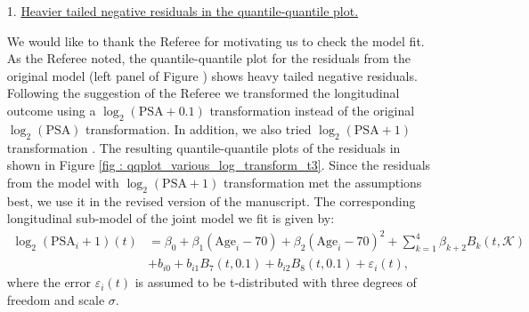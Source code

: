    \begin{enumerate}
        \item [1.] \underline{Heavier tailed negative residuals in the quantile-quantile plot.}

        We would like to thank the Referee for motivating us to check the model fit. As the Referee noted, the quantile-quantile plot for the residuals from the original model (left panel of Figure ) shows heavy tailed negative residuals. Following the suggestion of the Referee we transformed the longitudinal outcome using a $\log_2 (\mbox{PSA}+0.1)$ transformation instead of the original $\log_2 (\mbox{PSA})$ transformation. In addition, we also tried $\log_2 (\mbox{PSA}+1)$ transformation \citep{lin2000latent,pearson1994mixed}. The resulting quantile-quantile plots of the residuals in shown in Figure \ref{fig : qqplot_various_log_transform_t3}. Since the residuals from the model with $\log_2(\mbox{PSA} + 1)$ transformation met the assumptions best, we use it in the revised version of the manuscript. The corresponding longitudinal sub-model of the joint model we fit is given by:
        \begin{equation}
        \label{eq : long_model_prias_ref2}
        \begin{aligned}
    \log_2 (\mbox{PSA}_i + 1)(t) &= \beta_0 + \beta_1 (\mbox{Age}_i-70) + \beta_2 (\mbox{Age}_i-70)^2 + \sum_{k=1}^4 \beta_{k+2} B_k(t,\mathcal{K})\\ 
    &+  b_{i0} + b_{i1} B_7(t, 0.1) + b_{i2} B_8(t, 0.1) +
    \varepsilon_i(t),
    \end{aligned}
    \end{equation}
        where the error $\varepsilon_i(t)$ is assumed to be t-distributed with three degrees of freedom and scale $\sigma$.


\end{enumerate}
